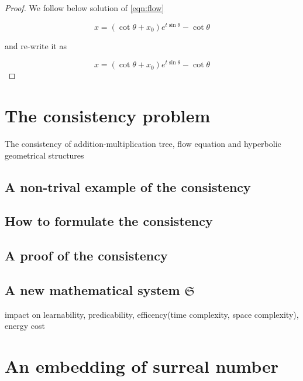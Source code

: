 \documentclass{article}
\begin{document}
\begin{proof}

We follow below solution of \eqref{eqn:flow}

\begin{equation}
   x = (\cot \theta + x_0) e^{t \sin \theta} - \cot \theta
\end{equation}

and re-write it as

\begin{equation}
   x = (\cot \theta + x_0) e^{t \sin \theta} - \cot \theta
\end{equation}

\end{proof}

\newpage

\section{The consistency problem}\label{sec:consistency}

The consistency of addition-multiplication tree, flow equation and hyperbolic geometrical structures

\subsection{A non-trival example of the consistency}

\subsection{How to formulate the consistency}

\subsection{A proof of the consistency}

\subsection{A new mathematical system $\mathfrak{S}$}

impact on learnability, predicability, efficency(time complexity, space complexity), energy cost

\newpage

\section{An embedding of surreal number}\label{sec:aeosn}
\end{document}
